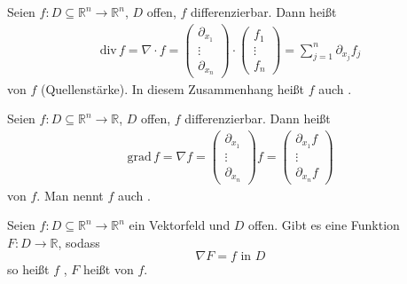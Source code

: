 \documentclass[a4paper,10pt]{scrbook}
\begin{document}
\begin{theorem}[Definition]
  \begin{enum-arab}
    \item Seien $f : D \subseteq \mathbb{R}^n \to \mathbb{R}^n$, $D$ offen, $f$ differenzierbar. Dann heißt
    \begin{align*}
      \mathrm{div}\, f = \nabla \cdot f =
      \begin{pmatrix} \partial_{x_1} \\ \vdots \\ \partial_{x_n} \end{pmatrix}
      \cdot
      \begin{pmatrix} f_1 \\ \vdots \\ f_n \end{pmatrix}
      =
      \sum\limits_{j=1}^{n} \partial_{x_j} f_j
    \end{align*}
     von $f$ (Quellenstärke). In diesem Zusammenhang heißt $f$ auch .

    \item Seien $f : D \subseteq \mathbb{R}^n \to \mathbb{R}$, $D$ offen, $f$ differenzierbar. Dann heißt
    \begin{align*}
      \mathrm{grad}\, f = \nabla f = \begin{pmatrix} \partial_{x_1} \\ \vdots \\ \partial_{x_n} \end{pmatrix} f = \begin{pmatrix} \partial_{x_1} f \\ \vdots \\ \partial_{x_n} f \end{pmatrix}
    \end{align*}
     von $f$. Man nennt $f$ auch .

    \item Seien $f : D \subseteq \mathbb{R}^n \to \mathbb{R}^n$ ein Vektorfeld und $D$ offen. Gibt es eine Funktion $F : D \to \mathbb{R}$, sodass \[ \nabla F = f \text{ in } D \] so heißt $f$ , $F$ heißt  von $f$.


\end{enum-arab}
\end{theorem}
\end{document}
